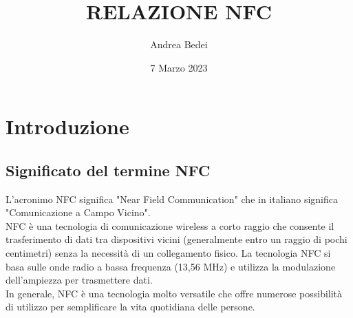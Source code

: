 \documentclass[a4paper,11pt]{report}
\title{\Huge RELAZIONE NFC}
\author{Andrea Bedei}
\date{7 Marzo 2023}
\begin{document}
\maketitle
\tableofcontents

\chapter{Introduzione}
\section{Significato del termine NFC}
L'acronimo NFC significa "Near Field Communication" che in italiano significa "Comunicazione a Campo Vicino". \\NFC è una tecnologia di comunicazione wireless a corto raggio che consente il trasferimento di dati tra dispositivi vicini (generalmente entro un raggio di pochi centimetri) senza la necessità di un collegamento fisico. La tecnologia NFC si basa sulle onde radio a bassa frequenza (13,56 MHz) e utilizza la modulazione dell'ampiezza per trasmettere dati.\\
In generale, NFC è una tecnologia molto versatile che offre numerose possibilità di utilizzo per semplificare la vita quotidiana delle persone.
\end{document}

